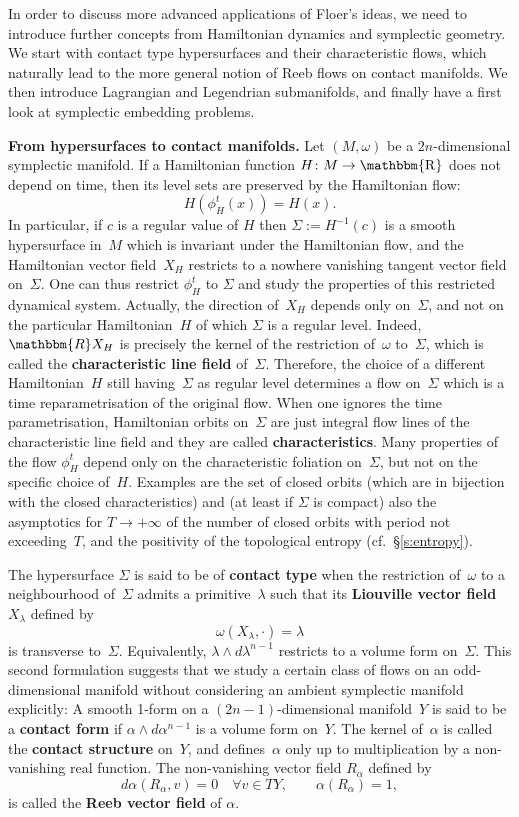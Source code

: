 \documentclass[12pt,twoside]{amsart}
\theoremstyle{plain}
\numberwithin{figure}{section}
\numberwithin{equation}{section}
\def\s{\smallskip}
\def\m{\medskip}
\def\RR{\mathbbm{R}}
\def\R{\operatorname{\mathbbm{R}}}
\def\ni{\noindent}
\def\m{\medskip}
\begin{document}
In order to discuss more advanced applications of Floer's ideas, 
we need to introduce further concepts from Hamiltonian dynamics and symplectic geometry.
We start with contact type hypersurfaces and their characteristic flows,  
which naturally lead to the more general notion of Reeb flows on contact manifolds. 
We then introduce Lagrangian and Legendrian submanifolds, and finally have a first look at symplectic embedding
problems.
%

\m \ni
{\bf From hypersurfaces to contact manifolds.}
Let $(M,\omega)$ be a $2n$-dimensional symplectic manifold. 
If a Hamiltonian function $H \colon M \rightarrow \R$ does not depend on time, 
then its level sets are preserved by the Hamiltonian flow:
\[
H(\phi^t_H(x)) = H(x).
\]
In particular, if $c$ is a regular value of $H$ then $\Sigma := H^{-1}(c)$ is a smooth hypersurface in~$M$ 
which is invariant under the Hamiltonian flow, and the Hamiltonian vector field~$X_H$ restricts to a nowhere vanishing tangent vector field on~$\Sigma$. 
%
One can thus restrict $\phi_H^t$ to $\Sigma$
and study the properties of this restricted dynamical system.
%
Actually, the direction of~$X_H$ depends only on~$\Sigma$, 
and not on the particular Hamiltonian~$H$ of which $\Sigma$ is a regular level. 
Indeed, $\RR X_H$ is precisely the kernel of the restriction of~$\omega$ to~$\Sigma$, 
which is called the {\bf characteristic line field} of~$\Sigma$.  
Therefore, the choice of a different Hamiltonian~$H$ still having~$\Sigma$ as regular level determines 
a flow on~$\Sigma$ which is a time reparametrisation of the original flow. 
When one ignores the time parametrisation, Hamiltonian orbits on~$\Sigma$ are just integral flow lines 
of the characteristic line field and they are called {\bf characteristics}.
%
Many properties of the flow $\phi_H^t$ depend only on the characteristic foliation on~$\Sigma$,
but not on the specific choice of~$H$. Examples are the set of closed orbits (which are in bijection with the closed characteristics) and (at least if $\Sigma$ is compact) also the asymptotics 
for $T \rightarrow +\infty$ of the number of closed orbits with period not exceeding~$T$, 
and the positivity of the topological entropy 
(cf.\ \S \ref{s:entropy}).

\s
The hypersurface $\Sigma$ is said to be of {\bf contact type} when the restriction of~$\omega$ to a neighbourhood of~$\Sigma$ admits a primitive~$\lambda$ such that its 
{\bf Liouville vector field}~$X_\lambda$ defined by
\[
\omega(X_{\lambda},\cdot) = \lambda
\]
is transverse to~$\Sigma$. 
Equivalently, $\lambda \wedge d\lambda^{n-1}$ restricts to a volume form on~$\Sigma$. 
%
This second formulation suggests that we study a certain class of flows
on an odd-dimensional manifold without considering an ambient symplectic manifold explicitly:
A smooth 1-form on a $(2n-1)$-dimensional manifold~$Y$ is said to be a {\bf contact form} 
if $\alpha \wedge d \alpha^{n-1}$ is a volume form on~$Y$. The kernel of~$\alpha$ is called the {\bf contact structure} on~$Y$, 
and defines~$\alpha$ only up to multiplication by a non-vanishing real function. 
The non-vanishing vector field $R_{\alpha}$ defined by
\[
d\alpha(R_{\alpha},v) = 0 \quad \forall v \in TY, \qquad \alpha(R_{\alpha}) = 1,
\]
is called the {\bf Reeb vector field} of $\alpha$. 
\end{document}
